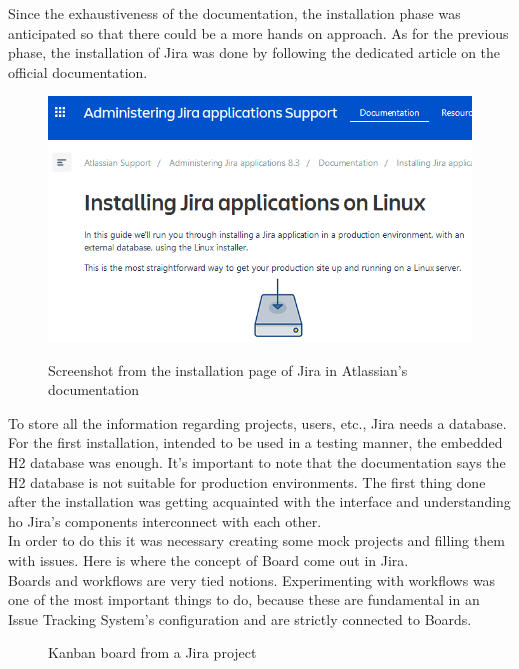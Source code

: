 	Since the exhaustiveness of the documentation, the installation phase was anticipated so that there could be a more hands on approach.
	As for the previous phase, the installation of Jira was done by following the dedicated article on the official documentation\cite{installing-jira-applications-on-linux}.	
	\begin{figure}[H]
		\centering
		\includegraphics[width=.9\textwidth]{resources/jira_installation}\\
		\caption{Screenshot from the installation page of Jira in Atlassian's documentation}
	\end{figure}
	To store all the information regarding projects, users, etc., Jira needs a database.
	For the first installation, intended to be used in a testing manner, the embedded \gls{H2 database} was enough.
	It's important to note that the documentation says the H2 database is not suitable for production environments\cite{accessing-jira-s-h2-embedded-database}.
	The first thing done after the installation was getting acquainted with the interface and understanding ho Jira's components interconnect with each other.\\
	In order to do this it was necessary creating some mock projects and filling them with issues.
	Here is where the concept of Board come out in Jira.\\
	Boards and workflows are very tied notions.
	Experimenting with workflows was one of the most important things to do, because these are fundamental in an Issue Tracking System's configuration and are strictly connected to Boards.
	\begin{figure}[H]
		\centering
		\caption{Kanban board from a Jira project}
	\end{figure}
